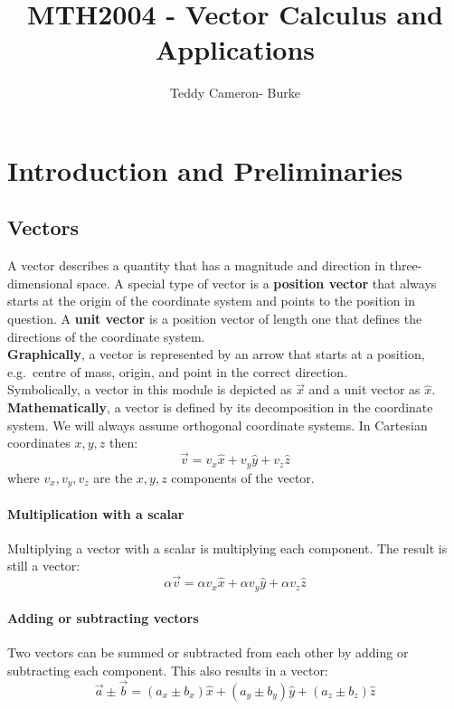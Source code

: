 \documentclass[11pt]{article}
\title{MTH2004 - Vector Calculus and Applications}
\author{Teddy Cameron- Burke}
\begin{document}
\maketitle
\section{Introduction and Preliminaries}\label{sec:introduction-and-preliminaries}
\subsection{Vectors}\label{subsec:vectors}
A vector describes a quantity that has a magnitude and direction in three-dimensional space.
A special type of vector is a \textbf{position vector} that always starts at the origin of the coordinate system and points to the position in question.
A \textbf{unit vector} is a position vector of length one that defines the directions of the coordinate system.\\
\textbf{Graphically}, a vector is represented by an arrow that starts at a position, e.g.\ centre of mass, origin, and point in the correct direction.\\
Symbolically, a vector in this module is depicted as $\vec{x}$ and a unit vector as $\hat{x}$.\\
\textbf{Mathematically}, a vector is defined by its decomposition in the coordinate system.
We will always assume orthogonal coordinate systems.
In Cartesian coordinates $x,y,z$ then:
   \begin{equation}
       \vec{v} = v_{x}\hat{x} + v_y\hat{y} + v_z\hat{z}\label{eq:equation} 
   \end{equation}
where $v_x, v_y, v_z$ are the $x, y, z$ components of the vector.\\
\paragraph{Multiplication with a scalar}
Multiplying a vector with a scalar is multiplying each component.
The result is still a vector:
    \begin{equation}
        \label{eq:equation2}
        \alpha \vec{v} = \alpha v_x \hat{x} + \alpha v_y \hat{y} + \alpha v_z \hat{z}
    \end{equation}
\paragraph{Adding or subtracting vectors}
Two vectors can be summed or subtracted from each other by adding or subtracting each component.
This also results in a vector:
    \begin{equation}
        \label{eq:equation3}
        \vec{a} \pm \vec{b} = (a_x \pm b_x)\hat{x} + (a_y \pm b_y)\hat{y} + (a_z \pm b_z)\hat{z}
    \end{equation}
\end{document}
